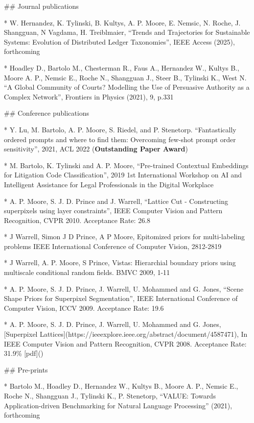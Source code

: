 
## Journal publications 

* W. Hernandez, K. Tylinski, B. Kultys, A. P. Moore,  E. Nemsic,  N. Roche, J. Shangguan, N Vagdama, H. Treiblmaier,  “Trends and Trajectories for Sustainable Systems: Evolution of Distributed Ledger Taxonomies”, IEEE Access (2025), forthcoming

* Hoadley D., Bartolo M., Chesterman R., Faus A., Hernandez W., Kultys B., Moore A. P., Nemsic E., Roche N., Shangguan J., Steer B., Tylinski K., West N. “A Global Community of Courts? Modelling the Use of Persuasive Authority as a Complex Network”, Frontiers in Physics (2021), 9, p.331 

## Conference publications 

* Y. Lu, M. Bartolo, A. P. Moore, S. Riedel, and P. Stenetorp. “Fantastically ordered prompts and where to find them: Overcoming few-shot prompt order sensitivity”, 2021, ACL 2022 (\textbf{Outstanding Paper Award})

* M. Bartolo, K. Tylinski and A. P. Moore, “Pre-trained Contextual Embeddings for Litigation Code Classification”, 2019 1st International Workshop on AI and Intelligent Assistance for Legal Professionals in the Digital Workplace

* A. P. Moore, S. J. D. Prince and J. Warrell, “Lattice Cut - Constructing superpixels using layer constraints”, IEEE Computer Vision and Pattern Recognition, CVPR 2010. Acceptance Rate: 26.8%

* J Warrell, Simon J D Prince, A P Moore, Epitomized priors for multi-labeling problems 
IEEE International Conference of Computer Vision, 2812-2819

* J Warrell, A. P. Moore, S Prince, Vistas: Hierarchial boundary priors using multiscale conditional random fields. BMVC 2009, 1-11

* A. P. Moore, S. J. D. Prince, J. Warrell, U. Mohammed and G. Jones, “Scene Shape Priors for Superpixel Segmentation”, IEEE International Conference of Computer Vision, ICCV 2009. Acceptance Rate: 19.6%

* A. P. Moore, S. J. D. Prince, J. Warrell, U. Mohammed and G. Jones, [Superpixel Lattices](https://ieeexplore.ieee.org/abstract/document/4587471), In IEEE Computer Vision and Pattern Recognition, CVPR 2008. Acceptance Rate: 31.9\% [pdf]()


## Pre-prints 

* Bartolo M., Hoadley D., Hernandez W., Kultys B., Moore A. P., Nemsic E., Roche N., Shangguan J., Tylinski K., P. Stenetorp, “VALUE: Towards Application-driven Benchmarking for Natural Language Processing” (2021), forthcoming


